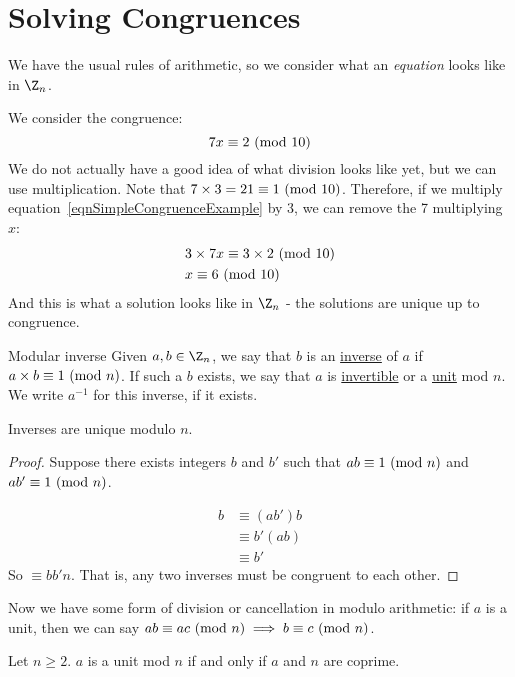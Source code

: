 \documentclass[../Main.tex]{subfiles}
\begin{document}
\section{Solving Congruences}
We have the usual rules of arithmetic, so we consider what an \textit{equation} looks like in $\Z_n$. 
\begin{example}
    We consider the congruence:
    \begin{equation}
        7x \equiv 2~(\text{mod}~{10})
        \label{eqnSimpleCongruenceExample}
    \end{equation}
    We do not actually have a good idea of what division looks like yet, but we can use multiplication. Note that $7 \times 3 = 21 \equiv 1~(\text{mod}~{10})$. Therefore, if we multiply equation~\ref{eqnSimpleCongruenceExample} by 3, we can remove the 7 multiplying $x$:
    \begin{align*}
        &3 \times 7x \equiv 3 \times 2~(\text{mod}~{10}) \\
        &x \equiv 6~(\text{mod}~{10})
    \end{align*}
    And this is what a solution looks like in $\Z_n$ - the solutions are unique up to congruence.
\end{example}
\begin{definition}{Modular inverse}
    Given $a, b \in \Z_n$, we say that $b$ is an \underline{inverse} of $a$ if $a \times b \equiv 1~(\text{mod}~{n})$. If such a $b$ exists, we say that $a$ is \underline{invertible} or a \underline{unit} mod $n$. We write $a^{-1}$ for this inverse, if it exists.
\end{definition}
\begin{proposition}
    Inverses are unique modulo $n$.
\end{proposition}
\begin{proof}
    Suppose there exists integers $b$ and $b'$ such that $ab \equiv 1~(\text{mod}~{n})$ and $ab' \equiv 1~(\text{mod}~{n})$.\par
    \begin{align*}
        b &\equiv (ab')b \\
        &\equiv b'(ab) \\
        &\equiv b'
    \end{align*}
    So $\equiv{b}{b'}{n}$. That is, any two inverses must be congruent to each other.
\end{proof}
Now we have some form of division or cancellation in modulo arithmetic: if $a$ is a unit, then we can say $ab \equiv ac~(\text{mod}~{n}) \implies b \equiv c~(\text{mod}~{n})$.
\begin{proposition}
    Let $n \geq 2$. $a$ is a unit mod $n$ if and only if $a$ and $n$ are coprime.
    \label{propUnitsCoprimes}
\end{proposition}
\end{document}
